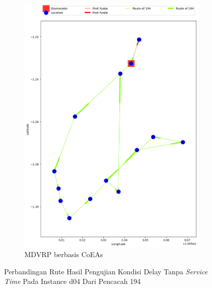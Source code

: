 \begin{figure}[H]
	\centering
	\begin{subfigure}[t]{\textwidth}
		\centering
		\includegraphics[width=\textwidth]{Resources/Images/delayed_5/real_m15_n100_delayed_5_194_coes}
		\caption{MDVRP berbasis CoEAs}
		\label{fig:real_m15_n100_delayed_5_194_coes}
	\end{subfigure}
	\caption{Perbandingan Rute Hasil Pengujian Kondisi Delay Tanpa \textit{Service Time} Pada Instance d04 Dari Pencacah 194}
	\label{fig:real_m15_n100_delayed_5_194}
\end{figure}


